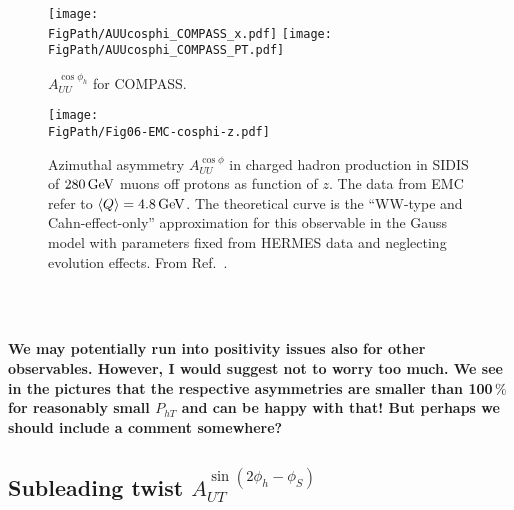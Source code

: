 \documentclass[a4paper,11pt]{article}
\newcommand{\blue}[1]{{\color{blue} #1}}
\newcommand{\la}{\langle}
\newcommand{\ra}{\rangle}
\newcommand{\PS}[1]{\blue{\bf\boldmath #1}}
\def\Phperp{P_{hT}}
\newcommand*{\FigPath}{./figs}%
\begin{document}
\begin{figure}[ht]
\centering
\texttt{[image: \\FigPath/AUUcosphi\_COMPASS\_x.pdf]} 
\texttt{[image: \\FigPath/AUUcosphi\_COMPASS\_PT.pdf]} 
\caption{\label{auucosphi_jlab} $A_{UU}^{\cos\phi_h}$  for COMPASS.
}
\end{figure}
        \begin{figure}[b!]
        \vspace{-0.6cm}
        \texttt{[image: \\FigPath/Fig06-EMC-cosphi-z.pdf]}
        \vspace{-0.5cm}
        \caption{\label{Fig-02:EMC}
        Azimuthal asymmetry $A_{UU}^{\cos\phi}$ in charged hadron 
        production in SIDIS of $280\,{\rm GeV}$ muons off protons
        as function of $z$. The data from EMC \cite{Aubert:1983cz}
        refer to $\la Q\ra=4.8\,{\rm GeV}$. The theoretical
        curve is the ``WW-type and Cahn-effect-only'' approximation 
        for this observable in the Gauss model with parameters 
        fixed from HERMES data and neglecting evolution effects. 
	From Ref.~\cite{Schweitzer:2010tt}.}
        \end{figure}

\

\ \\
\PS{We may potentially run into positivity issues also for other observables. 
However, I would suggest not to worry too much. We see in the pictures that 
the respective asymmetries are smaller than 100$\,\%$ for reasonably small 
$\Phperp$ and can be happy with that! But perhaps we should include a 
comment somewhere?}



\newpage
\subsection{\boldmath Subleading twist  $A_{UT}^{\sin(2\phi_h-\phi_S)}$ }
\label{Sec-7.8:FUTsin2phi-phiS}
\end{document}

